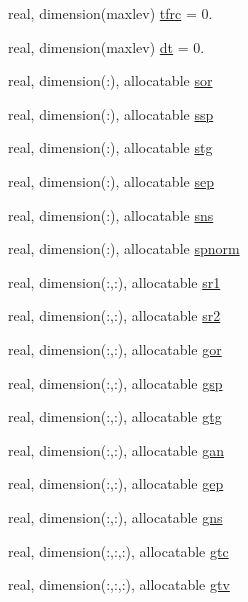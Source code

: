 \begin{DoxyCompactItemize}
\item 
real, dimension(maxlev) \hyperlink{classpumamod_ac25246ebd045c4eba43e3cf8d1d7596e}{tfrc} = 0.
\item 
real, dimension(maxlev) \hyperlink{classpumamod_ad1899f0a731ed4ab715422d9fd8d444b}{dt} = 0.
\item 
real, dimension(\-:), allocatable \hyperlink{classpumamod_a25b4901a49e21188037f1e234de26a52}{sor}
\item 
real, dimension(\-:), allocatable \hyperlink{classpumamod_a9e408d75104293064d995076d4dbbce4}{ssp}
\item 
real, dimension(\-:), allocatable \hyperlink{classpumamod_ab9cb9fb36cedabd96373ce2d69554d93}{stg}
\item 
real, dimension(\-:), allocatable \hyperlink{classpumamod_a0a5b087ce0b768e344e2e0fd38dccd49}{sep}
\item 
real, dimension(\-:), allocatable \hyperlink{classpumamod_af7adda7c9fa3da6ac86737a9579b4588}{sns}
\item 
real, dimension(\-:), allocatable \hyperlink{classpumamod_a8da7a3798ee3323bf38b6c7b815a3928}{spnorm}
\item 
real, dimension(\-:,\-:), allocatable \hyperlink{classpumamod_a3eb3e9be54dfc5066878573e5bac8386}{sr1}
\item 
real, dimension(\-:,\-:), allocatable \hyperlink{classpumamod_ae778b35555f5b6530d47f7cb75422a94}{sr2}
\item 
real, dimension(\-:,\-:), allocatable \hyperlink{classpumamod_a40784d8720abb9ae62f1a66c0dbf666d}{gor}
\item 
real, dimension(\-:,\-:), allocatable \hyperlink{classpumamod_aade6f1ed946b27ba82c9ec0249699994}{gsp}
\item 
real, dimension(\-:,\-:), allocatable \hyperlink{classpumamod_ad349c2130e94459e9c8e90c4b4208876}{gtg}
\item 
real, dimension(\-:,\-:), allocatable \hyperlink{classpumamod_aa15249f48df29a85f239fb007058eacb}{gan}
\item 
real, dimension(\-:,\-:), allocatable \hyperlink{classpumamod_a8f2231a34a19b8792db080ae8e4d9454}{gep}
\item 
real, dimension(\-:,\-:), allocatable \hyperlink{classpumamod_adaa3dc50fbf3e39e14e9e2e9320e8f6f}{gns}
\item 
real, dimension(\-:,\-:,\-:), allocatable \hyperlink{classpumamod_acb21b0133fc9d543c9a472c65c1fc025}{gtc}
\item 
real, dimension(\-:,\-:,\-:), allocatable \hyperlink{classpumamod_a24ec113507c8c09685e26fdf2ad94948}{gtv}

\end{DoxyCompactItemize}
